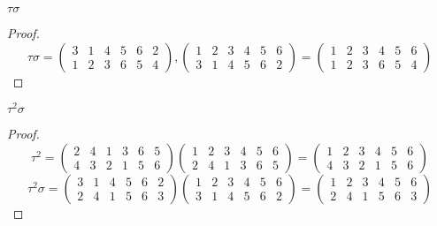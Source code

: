 \newpage
\begin{exercise}
    $\tau\sigma$
\end{exercise}

\begin{proof}
    \[
        \tau\sigma =
        \begin{pmatrix}
            3 & 1 & 4 & 5 & 6 & 2 \\
            1 & 2 & 3 & 6 & 5 & 4
        \end{pmatrix},
        \begin{pmatrix}
            1 & 2 & 3 & 4 & 5 & 6 \\
            3 & 1 & 4 & 5 & 6 & 2
        \end{pmatrix} =
        \begin{pmatrix}
            1 & 2 & 3 & 4 & 5 & 6 \\
            1 & 2 & 3 & 6 & 5 & 4
        \end{pmatrix}
    \]
\end{proof}

\newpage
\begin{exercise}
    ${\tau}^{2}\sigma$
\end{exercise}

\begin{proof}
    \[
        {\tau}^{2} =
        \begin{pmatrix}
            2 & 4 & 1 & 3 & 6 & 5 \\
            4 & 3 & 2 & 1 & 5 & 6
        \end{pmatrix}
        \begin{pmatrix}
            1 & 2 & 3 & 4 & 5 & 6 \\
            2 & 4 & 1 & 3 & 6 & 5
        \end{pmatrix} =
        \begin{pmatrix}
            1 & 2 & 3 & 4 & 5 & 6 \\
            4 & 3 & 2 & 1 & 5 & 6
        \end{pmatrix}
    \]
    \[
        {\tau}^{2}\sigma =
        \begin{pmatrix}
            3 & 1 & 4 & 5 & 6 & 2 \\
            2 & 4 & 1 & 5 & 6 & 3
        \end{pmatrix}
        \begin{pmatrix}
            1 & 2 & 3 & 4 & 5 & 6 \\
            3 & 1 & 4 & 5 & 6 & 2
        \end{pmatrix} =
        \begin{pmatrix}
            1 & 2 & 3 & 4 & 5 & 6 \\
            2 & 4 & 1 & 5 & 6 & 3
        \end{pmatrix}
    \]
\end{proof}

